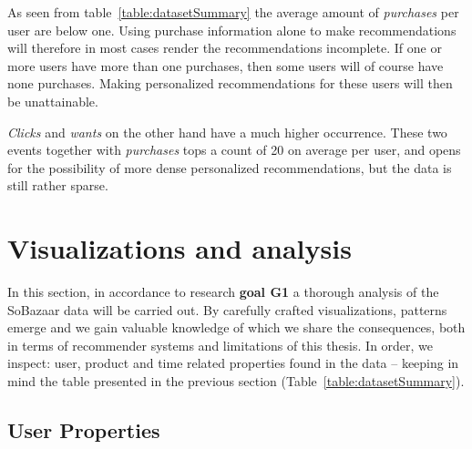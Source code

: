 As seen from table~\ref{table:datasetSummary} the average amount of
\emph{purchases} per user are below one. Using purchase information alone to
make recommendations will therefore in most cases render the recommendations
incomplete. If one or more users have more than one purchases, then some users
will of course have none purchases. Making personalized recommendations for
these users will then be unattainable.

\emph{Clicks} and \emph{wants} on the other hand have a much higher occurrence.
These two events together with \emph{purchases} tops a count of 20 on average
per user, and opens for the possibility of more dense personalized
recommendations, but the data is still rather sparse.

\section{Visualizations and analysis}

In this section, in accordance to research \textbf{goal G1} a thorough analysis
of the SoBazaar data will be carried out. By carefully crafted visualizations,
patterns emerge and we gain valuable knowledge of which we share the
consequences, both in terms of recommender systems and limitations of this
thesis. In order, we inspect: user, product and time related properties found in
the data -- keeping in mind the table presented in the previous section
(Table~\ref{table:datasetSummary}).

\subsection{User Properties}

